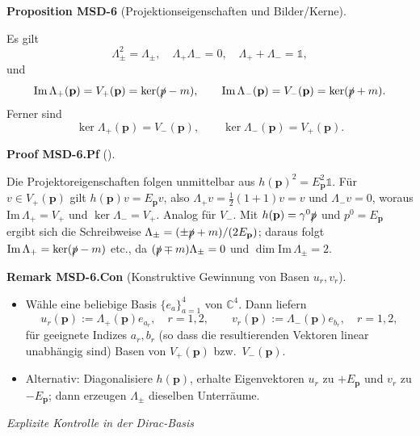 \documentclass[10pt, letterpaper]{article}
\newcommand{\C}{\mathbb{C}}
\newcommand{\CustomHeading}[3]{%
  \par\medskip\noindent%
  \textbf{#1 #2} \textnormal{(#3)}.\enskip%
}
\newenvironment{PROP}[2]{\begin{unitbox}\CustomHeading{Proposition}{#1}{#2}}{\end{unitbox}}
\newenvironment{REM}[2]{\begin{unitbox}\CustomHeading{Remark}{#1}{#2}}{\end{unitbox}}
\newenvironment{PROOF}[2]{\begin{unitbox}\CustomHeading{Proof}{#1}{#2}}{\end{unitbox}}
\begin{document}
\begin{PROP}{MSD-6}{Projektionseigenschaften und Bilder/Kerne}
Es gilt
\[
\Lambda_\pm^2=\Lambda_\pm,\quad \Lambda_+\Lambda_-=0,\quad \Lambda_++\Lambda_-=\mathbb 1,
\]
und
\[
\mathrm{Im}\,\Lambda_+(\mathbf p)=V_+(\mathbf p)=\ker(\slashed p-m),\qquad
\mathrm{Im}\,\Lambda_-(\mathbf p)=V_-(\mathbf p)=\ker(\slashed p+m).
\]
Ferner sind
\[
\ker\Lambda_+(\mathbf p)=V_-(\mathbf p),\qquad
\ker\Lambda_-(\mathbf p)=V_+(\mathbf p).
\]
\end{PROP}

\begin{PROOF}{MSD-6.Pf}{}
Die Projektoreigenschaften folgen unmittelbar aus $h(\mathbf p)^2=E_{\mathbf p}^2\mathbb 1$. Für $v\in V_+(\mathbf p)$ gilt $h(\mathbf p)v=E_{\mathbf p}v$, also $\Lambda_+v=\tfrac12(1+1)v=v$ und $\Lambda_-v=0$, woraus $\mathrm{Im}\,\Lambda_+=V_+$ und $\ker\Lambda_-=V_+$.
Analog für $V_-$.
Mit $h(\mathbf p)=\gamma^0\slashed p$ und $p^0=E_{\mathbf p}$ ergibt sich die Schreibweise $\Lambda_\pm=(\pm\slashed p+m)/(2E_{\mathbf p})$; daraus folgt $\mathrm{Im}\,\Lambda_+=\ker(\slashed p-m)$ etc., da $(\slashed p\mp m)\Lambda_\pm=0$ und $\dim \mathrm{Im}\,\Lambda_\pm=2$.
\end{PROOF}

\begin{REM}{MSD-6.Con}{Konstruktive Gewinnung von Basen $u_r,v_r$}
\begin{itemize}
\item Wähle eine beliebige Basis $\{e_a\}_{a=1}^4$ von $\C^4$. Dann liefern
\[
u_r(\mathbf p):=\Lambda_+(\mathbf p)e_{a_r},\quad r=1,2,
\qquad
v_r(\mathbf p):=\Lambda_-(\mathbf p)e_{b_r},\quad r=1,2,
\]
für geeignete Indizes $a_r,b_r$ (so dass die resultierenden Vektoren linear unabhängig sind) Basen von $V_+(\mathbf p)$ bzw.\ $V_-(\mathbf p)$.
\item Alternativ: Diagonalisiere $h(\mathbf p)$, erhalte Eigenvektoren $u_r$ zu $+E_{\mathbf p}$ und $v_r$ zu $-E_{\mathbf p}$; dann erzeugen $\Lambda_\pm$ dieselben Unterräume.
\end{itemize}
\end{REM}

\emph{Explizite Kontrolle in der Dirac-Basis}
\end{document}
